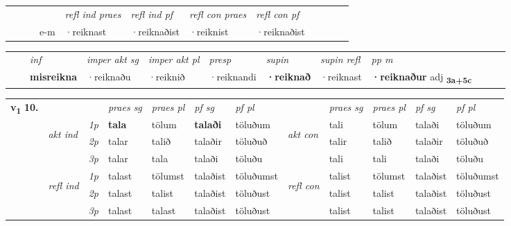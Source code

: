 \begin{tabular}{llllllllllll}
 & &  & &  \textit{refl ind praes} & \textit{refl ind pf} & \textit{refl con praes} & \textit{refl con pf} \\*
&  & & e-m & ·reiknast & ·reiknaðist & ·reiknist & ·reiknaðist \\*
\cmidrule{5-9}
\end{tabular}


\begin{tabular}{llllllllllll}
 & & \textit{inf} & \textit{imper akt sg} & \textit{imper akt pl}   & \textit{presp} & \textit{supin} & \textit{supin refl} & \textit{pp m}     \\*
  & & \textbf{misreikna} & ·reiknaðu  & ·reiknið   & ·reiknandi &  \textbf{·reiknað} & ·reiknast & \textbf{·reiknaður} adj \textbf{\textsubscript{3a+5c}} \\*
\cmidrule{1-12}
\end{tabular}



\begin{tabular}{llllllllllll} \toprule
\multirow{4}{*}{{{\textbf{v{\textsubscript{1}}} \Large{\textbf{10.}}}}}  & &   &  \textit{praes sg}  & \textit{praes pl}  &\textit{ pf sg} & \textit{pf pl} &  &  \textit{praes sg}  & \textit{praes pl}  & \textit{pf sg} & \textit{pf pl } \\*
	\cmidrule{4-7} \cmidrule{9-12}
 & \multirow{3}{*}{\begin{turn}{90}\textit{akt ind}\end{turn}} & {\textit{1p}} & \textbf{tala} & tölum    & \textbf{talaði} & töluðum & \multirow{3}{*}{\begin{turn}{90}\textit{akt con}\end{turn}} &tali & tölum & talaði & töluðum\\*
& &  {\textit{2p}} &  talar  & talið   & talaðir & töluðuð & & talir & talið & talaðir & töluðuð \\*
& &  {\textit{3p}} & talar & tala   & talaði & töluðu & & tali & tali& talaði & töluðu  \\*
\cmidrule{4-7} \cmidrule{9-12}
 &\multirow{3}{*}{\begin{turn}{90}\textit{refl ind}\end{turn}} & {\textit{1p}} & talast & tölumst    & talaðist & töluðumst & \multirow{3}{*}{\begin{turn}{90}\textit{refl con}\end{turn}}  &talist & tölumst & talaðist & töluðumst\\*
 &&  {\textit{2p}} &  talast  & talist   & talaðist & töluðust & &talist & talist & talaðist & töluðust \\*
& &  {\textit{3p}} & talast & talast   & talaðist & töluðust & & talist & talist& talaðist & töluðust  \\*
\cmidrule{4-7} \cmidrule{9-12}
\end{tabular}


